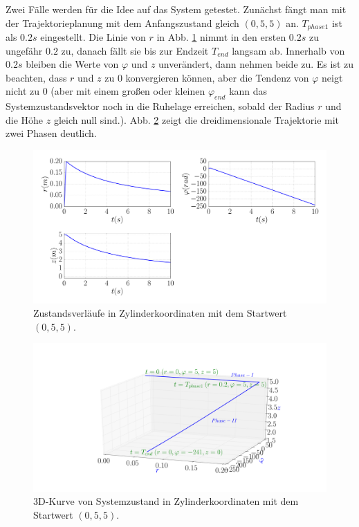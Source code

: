 Zwei Fälle werden für die Idee auf das System getestet. Zunächst fängt man mit der Trajektorieplanung mit dem Anfangszustand gleich $(0,5,5)$ an. $T_{phase1}$ ist als $0.2s$ eingestellt. Die Linie von $r$ in Abb. \ref{fig:Brockett_e2_Switch_ein_Fall} nimmt in den ersten $0.2s$ zu ungefähr $0.2$ zu, danach fällt sie bis zur Endzeit $T_{end}$ langsam ab. Innerhalb von $0.2s$ bleiben die Werte von $\varphi$ und $z$ unverändert, dann nehmen beide zu. Es ist zu beachten, dass $r$ und $z$ zu $0$ konvergieren können, aber die Tendenz von $\varphi$ neigt nicht zu $0$ (aber mit einem großen oder kleinen $\varphi_{end}$ kann das Systemzustandsvektor noch in die Ruhelage erreichen, sobald der Radius $r$ und die Höhe $z$ gleich null sind.). Abb. \ref{fig:3d_Brockett_e2_Switch} zeigt die dreidimensionale Trajektorie mit zwei Phasen deutlich.
\begin{figure}[!h]
	\centering
	\includegraphics[width=\linewidth]{bild/30_32/Brockett_e2_Switch_x.pdf}%
	\caption{Zustandsverläufe in Zylinderkoordinaten mit dem Startwert $(0,5,5)$.}
	\label{fig:Brockett_e2_Switch_ein_Fall}
\end{figure}

\begin{figure}[!h]
	\centering
	\includegraphics[width=0.8\linewidth]{bild/30_32/3d_Brockett_e2_Switch.pdf}%
	\caption{3D-Kurve von Systemzustand in Zylinderkoordinaten mit dem Startwert $(0,5,5)$.}
	\label{fig:3d_Brockett_e2_Switch}
\end{figure}


